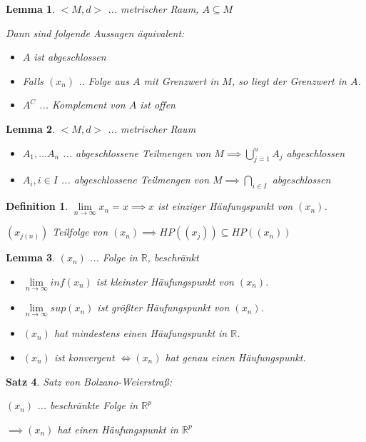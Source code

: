 \documentclass[twocolumn]{article}
\newtheorem{theorem}{Satz}[section]
\newtheorem{lemma}[theorem]{Lemma}
\newtheorem{definition}{Definition}[section]
\newcommand*{\logeq}{\Leftrightarrow}
\begin{document}
\begin{lemma}
	$<M,d>$ ... metrischer Raum, $A \subseteq M$
	
	Dann sind folgende Aussagen äquivalent:
	
	\begin{itemize}
		\item $A$ ist abgeschlossen
		\item Falls $(x_n)$ .. Folge aus $A$ mit Grenzwert in $M$, so liegt der Grenzwert in $A$.
		\item $A^C$ ... Komplement von $A$ ist offen
	\end{itemize}
\end{lemma}

\begin{lemma}
	$<M,d>$ ... metrischer Raum
	
	\begin{itemize}
		\item $A_1, ... A_n$ ... abgeschlossene Teilmengen von $M \implies \bigcup_{j=1}^{n}A_j$ abgeschlossen
		\item $A_i, i \in I$ ... abgeschlossene Teilmengen von $M \implies \bigcap_{i\in I}$ abgeschlossen
	\end{itemize}
\end{lemma}

\begin{definition}
	$\lim\limits_{n\rightarrow\infty}x_n = x \implies x$ ist einziger Häufungspunkt von $(x_n)$.
	
	$(x_{j(n)})$ Teilfolge von $(x_n) \implies HP((x_j))\subseteq HP((x_n))$
\end{definition}

\begin{lemma}
	$(x_n)$ ... Folge in $\mathbb{R}$, beschränkt
	
	\begin{itemize}
		\item $\lim\limits_{n\rightarrow \infty}inf(x_n)$ ist kleinster Häufungspunkt von $(x_n)$.
		\item $\lim\limits_{n\rightarrow \infty}sup(x_n)$ ist größter Häufungspunkt von $(x_n)$.
		\item $(x_n)$ hat mindestens einen Häufungspunkt in $\mathbb{R}$.
		\item $(x_n)$ ist konvergent $\logeq (x_n)$ hat genau einen Häufungspunkt.
	\end{itemize}
\end{lemma}

\begin{theorem}
	Satz von Bolzano-Weierstraß:
	
	$(x_n)$ ... beschränkte Folge in $\mathbb{R}^p$
	
	$\implies (x_n)$ hat einen Häufungspunkt in $\mathbb{R}^p$
\end{theorem}
\end{document}
